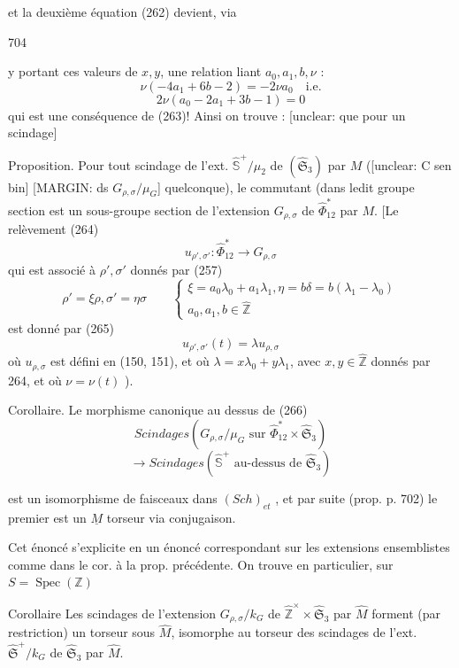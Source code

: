 et la deuxième équation (262) devient, via

\newpage


704

y portant ces valeurs de $x, y$, une relation
liant $a_0, a_1, b, \nu$ :
$$ \nu(-4a_1+6b-2) = -2\nu a_0 \quad \text{i.e.} $$
$$ 2\nu(a_0-2a_1+3b-1)=0 $$
qui est une conséquence de (263)! Ainsi
on trouve : [unclear: que pour un scindage]

Proposition. Pour tout scindage de l'ext.
$\widehat{\mathbb{S}}^+/\mu_2$ de $(\widehat{\mathfrak{S}}_3)$ par $M$ ([unclear: C sen bin]
[MARGIN: ds $G_{\rho,\sigma}/\mu_G$]
quelconque), le commutant (dans ledit
groupe section est un sous-groupe
section de l'extension $G_{\rho,\sigma}$ de $\widehat{\Phi}_{12}^*$
par $M$. [Le relèvement
(264) $$ u_{\rho',\sigma'} : \widehat{\Phi}_{12}^* \to G_{\rho,\sigma} $$
qui est associé à $\rho',\sigma'$ donnés par (257)
$$ \rho' = \xi \rho, \sigma' = \eta \sigma \qquad \begin{cases} \xi = a_0 \lambda_0 + a_1 \lambda_1, \eta = b \delta = b(\lambda_1 - \lambda_0) \\ a_0, a_1, b \in \hat{\mathbb{Z}} \end{cases} $$
est donné par
(265) $$ u_{\rho',\sigma'}(t) = \lambda u_{\rho,\sigma} $$
où $u_{\rho,\sigma}$ est défini en (150, 151), et
où $\lambda = x \lambda_0 + y \lambda_1$, avec $x, y \in \hat{\mathbb{Z}}$ donnés
par 264, et où $\nu = \nu(t)$ ).

Corollaire. Le morphisme canonique
au dessus de
(266) $$ Scindages (G_{\rho,\sigma}/\mu_G \text{ sur } \widehat{\Phi}_{12}^* \times \widehat{\mathfrak{S}}_3) $$
$$ \longrightarrow Scindages(\widehat{\mathbb{S}}^+ \text{ au-dessus de } \widehat{\mathfrak{S}}_3) $$

\newpage


est un isomorphisme de faisceaux
dans $(Sch)_{et}$ , et par suite (prop. p. 702)
le premier est un $\underline{M}$ torseur via
conjugaison.

Cet énoncé s'explicite en un énoncé
correspondant sur les extensions ensemblistes
comme dans le cor. à la prop. précédente.
On trouve en particulier, sur $S = \operatorname{Spec}(\mathbb{Z})$

Corollaire Les scindages de l'extension
$G_{\rho,\sigma}/k_G$ de $\hat{\mathbb{Z}}^\times \times \hat{\mathfrak{S}}_3$ par $\hat{M}$ forment
(par restriction) un torseur sous $\hat{M}$, isomorphe au torseur
des scindages de l'ext. $\hat{\mathfrak{S}}^+ / k_G$ de
$\hat{\mathfrak{S}}_3$ par $\hat{M}$.

